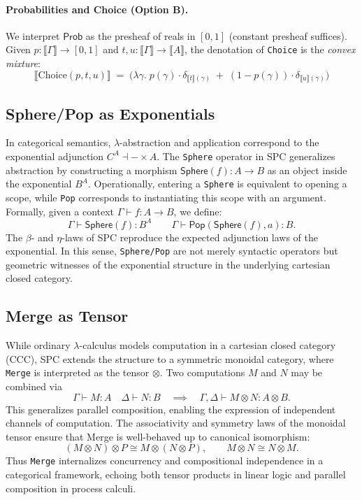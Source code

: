 \documentclass{article}
\begin{document}
\paragraph{Probabilities and Choice (Option B).}
We interpret $\mathsf{Prob}$ as the presheaf of reals in $[0,1]$ (constant presheaf suffices).
Given $p : \llbracket \Gamma \rrbracket \to [0,1]$ and $t,u : \llbracket \Gamma \rrbracket \to \llbracket A \rrbracket$,
the denotation of \texttt{Choice} is the \emph{convex mixture}:
\[
\llbracket \mathrm{Choice}(p,t,u) \rrbracket
\;=\;
\big(\lambda \gamma.\; p(\gamma)\cdot \delta_{\llbracket t \rrbracket(\gamma)} \;+\; (1-p(\gamma))\cdot \delta_{\llbracket u \rrbracket(\gamma)} \big)
\]
\subsection{Sphere/Pop as Exponentials}

In categorical semantics, $\lambda$-abstraction and application correspond to
the exponential adjunction $C^{A} \dashv - \times A$. The \texttt{Sphere}
operator in SPC generalizes abstraction by constructing a morphism
$\mathsf{Sphere}(f) : A \to B$ as an object inside the exponential
$B^{A}$. Operationally, entering a \texttt{Sphere} is equivalent to opening a
scope, while \texttt{Pop} corresponds to instantiating this scope with an
argument. Formally, given a context $\Gamma \vdash f : A \to B$, we define:
\[
  \Gamma \vdash \mathsf{Sphere}(f) : B^A
  \qquad
  \Gamma \vdash \mathsf{Pop}(\mathsf{Sphere}(f), a) : B.
\]
The $\beta$- and $\eta$-laws of SPC reproduce the expected adjunction laws of
the exponential. In this sense, \texttt{Sphere/Pop} are not merely syntactic
operators but geometric witnesses of the exponential structure in the
underlying cartesian closed category.

\subsection{Merge as Tensor}

While ordinary $\lambda$-calculus models computation in a cartesian closed
category (CCC), SPC extends the structure to a symmetric monoidal category,
where \texttt{Merge} is interpreted as the tensor $\otimes$. Two computations
$M$ and $N$ may be combined via
\[
  \Gamma \vdash M : A \quad \Delta \vdash N : B
  \quad \implies \quad \Gamma, \Delta \vdash M \otimes N : A \otimes B.
\]
This generalizes parallel composition, enabling the expression of
independent channels of computation. The associativity and symmetry laws of the
monoidal tensor ensure that Merge is well-behaved up to canonical isomorphism:
\[
  (M \otimes N) \otimes P \cong M \otimes (N \otimes P),
  \qquad
  M \otimes N \cong N \otimes M.
\]
Thus \texttt{Merge} internalizes concurrency and compositional independence in
a categorical framework, echoing both tensor products in linear logic and
parallel composition in process calculi.
\end{document}

